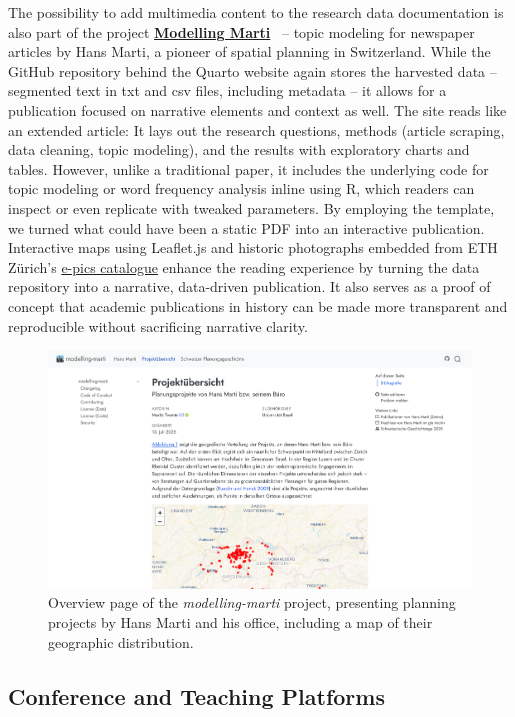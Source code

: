 \documentclass{anthology-ch}         %
\begin{document}
The possibility to add multimedia content to the research data documentation is also part of the project \href{https://mtwente.github.io/modelling-marti}{\textbf{Modelling Marti}}~\cite{twente2025b} -- topic modeling for newspaper articles by Hans Marti, a pioneer of spatial planning in Switzerland. While the GitHub repository behind the Quarto website again stores the harvested data -- segmented text in txt and csv files, including metadata -- it allows for a publication focused on narrative elements and context as well. The site reads like an extended article: It lays out the research questions, methods (article scraping, data cleaning, topic modeling), and the results with exploratory charts and tables. However, unlike a traditional paper, it includes the underlying code for topic modeling or word frequency analysis inline using R, which readers can inspect or even replicate with tweaked parameters. By employing the template, we turned what could have been a static PDF into an interactive publication. Interactive maps using Leaflet.js and historic photographs embedded from ETH Zürich's \href{https://e-pics3.ethz.ch/de/home/}{e-pics catalogue} enhance the reading experience by turning the data repository into a narrative, data-driven publication. It also serves as a proof of concept that academic publications in history can be made more transparent and reproducible without sacrificing narrative clarity.

\begin{figure}[t!]
  \centering
  \includegraphics[width=0.9\linewidth]{images/modelling_marti.png}
  \caption{Overview page of the \emph{modelling-marti} project, presenting planning projects by Hans Marti and his office, including a map of their geographic distribution.}
  \label{fig-modelling-marti}
\end{figure}

\subsection{Conference and Teaching Platforms}\label{conference-and-teaching-platforms}
\end{document}
